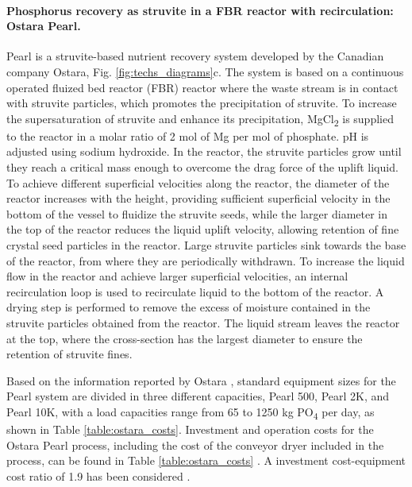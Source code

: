 \begin{refsection}[referencesCh4]
\paragraph{Phosphorus recovery as struvite in a FBR reactor with recirculation: Ostara Pearl.}
Pearl is a struvite-based nutrient recovery system developed by the Canadian company Ostara, Fig. \ref{fig:techs_diagrams}c. The system is based on a continuous operated fluized bed reactor (FBR) reactor where the waste stream is in contact with struvite particles, which promotes the precipitation of struvite. To increase the supersaturation of struvite and enhance its precipitation, MgCl\textsubscript{2} is supplied to the reactor in a molar ratio of 2 mol of Mg per mol of phosphate. pH is adjusted using sodium hydroxide. In the reactor, the struvite particles grow until they reach a critical mass enough to overcome the drag force of the uplift liquid. To achieve different superficial velocities along the reactor, the diameter of the reactor increases with the height, providing sufficient superficial velocity in the bottom of the vessel to fluidize the struvite seeds, while the larger diameter in the top of the reactor reduces the liquid uplift velocity, allowing retention of fine crystal seed particles in the reactor. Large struvite particles sink towards the base of the reactor, from where they are periodically withdrawn. To increase the liquid flow in the reactor and achieve larger superficial velocities, an internal recirculation loop is used to recirculate liquid to the bottom of the reactor. A drying step is performed to remove the excess of moisture contained in the struvite particles obtained from the reactor. The liquid stream leaves the reactor at the top, where the cross-section has the largest diameter to ensure the retention of struvite fines.

Based on the information reported by Ostara \citep{Pearl2Kcost2}, standard equipment sizes for the Pearl system are divided in three different capacities, Pearl 500, Pearl 2K, and Pearl 10K, with a load capacities range from 65 to 1250 kg PO\textsubscript{4} per day, as shown in Table \ref{table:ostara_costs}. Investment and operation costs for the Ostara Pearl process, including the cost of the conveyor dryer included in the process, can be found in Table \ref{table:ostara_costs} \citep{Pearl500cost1, Pearl2Kcost1, Pearl2Kcost2, Pearl10Kcost1}. A investment cost-equipment cost ratio of 1.9 has been considered \citep{Pearl2Kcost2}.


\end{refsection}

